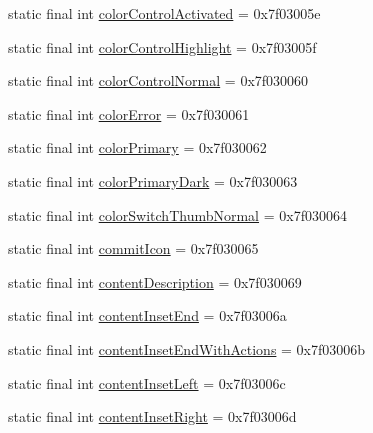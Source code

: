 \begin{DoxyCompactItemize}
static final int \mbox{\hyperlink{classandroid_1_1support_1_1design_1_1_r_1_1attr_afe306e82da2093e0461e14011062f6d0}{color\+Control\+Activated}} = 0x7f03005e
\item 
static final int \mbox{\hyperlink{classandroid_1_1support_1_1design_1_1_r_1_1attr_a9b9ac1ed1cd6476e66fbf585519be242}{color\+Control\+Highlight}} = 0x7f03005f
\item 
static final int \mbox{\hyperlink{classandroid_1_1support_1_1design_1_1_r_1_1attr_a90e1ede923ec8393bd6f1a3218f9836b}{color\+Control\+Normal}} = 0x7f030060
\item 
static final int \mbox{\hyperlink{classandroid_1_1support_1_1design_1_1_r_1_1attr_a7786c29d02d412e4facdf912d6ec6714}{color\+Error}} = 0x7f030061
\item 
static final int \mbox{\hyperlink{classandroid_1_1support_1_1design_1_1_r_1_1attr_ae16c90f75dbb495b67dbcc7d3b2d5875}{color\+Primary}} = 0x7f030062
\item 
static final int \mbox{\hyperlink{classandroid_1_1support_1_1design_1_1_r_1_1attr_a03a2e86e19456d190709fd13c9245eff}{color\+Primary\+Dark}} = 0x7f030063
\item 
static final int \mbox{\hyperlink{classandroid_1_1support_1_1design_1_1_r_1_1attr_a079f7b1cfe50d26938aeeea1cd78e6ad}{color\+Switch\+Thumb\+Normal}} = 0x7f030064
\item 
static final int \mbox{\hyperlink{classandroid_1_1support_1_1design_1_1_r_1_1attr_a11bbc63f864f8a93e51e41de4ed8cb1b}{commit\+Icon}} = 0x7f030065
\item 
static final int \mbox{\hyperlink{classandroid_1_1support_1_1design_1_1_r_1_1attr_ae78a680bbf1707e86baa2ecf2ce807ac}{content\+Description}} = 0x7f030069
\item 
static final int \mbox{\hyperlink{classandroid_1_1support_1_1design_1_1_r_1_1attr_ade46dc0fa819b1068e4a9914ae7e17ea}{content\+Inset\+End}} = 0x7f03006a
\item 
static final int \mbox{\hyperlink{classandroid_1_1support_1_1design_1_1_r_1_1attr_ab6569b42b5cae3a7779fd2eeadc3a67a}{content\+Inset\+End\+With\+Actions}} = 0x7f03006b
\item 
static final int \mbox{\hyperlink{classandroid_1_1support_1_1design_1_1_r_1_1attr_a8de8b60fcce084326706615ffa0eb7fe}{content\+Inset\+Left}} = 0x7f03006c
\item 
static final int \mbox{\hyperlink{classandroid_1_1support_1_1design_1_1_r_1_1attr_aecf3f2220db7da109fc27bc18b181056}{content\+Inset\+Right}} = 0x7f03006d
\item 

\end{DoxyCompactItemize}
